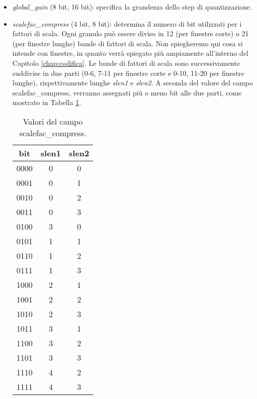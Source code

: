 \begin{itemize}
\begin{itemize}
						\item \textit{global\_gain} (8 bit, 16 bit): specifica la grandezza dello step di quantizzazione.
						
						\item \textit{scalefac\_compress} (4 bit, 8 bit): determina il numero di bit utilizzati per i fattori di scala. Ogni granulo può essere diviso in 12 (per finestre corte) o 21 (per finestre lunghe) bande di fattori di scala. Non spiegheremo qui cosa si intende con finestre, in quanto verrà spiegato più ampiamente all'interno del Capitolo \ref{chap:codifica}. Le bande di fattori di scala sono successivamente suddivise in due parti (0-6, 7-11 per finestre corte e 0-10, 11-20 per finestre lunghe), rispettivamente lunghe \textit{slen1} e \textit{slen2}. A seconda del valore del campo scalefac\_compress, verranno assegnati più o meno bit alle due parti, come mostrato in Tabella \ref{tab:campo_scalefac_compress}.
						
							\begin{table}[h!]
								\centering
								\begin{tabular}{|c|c|c|}
									\multicolumn{1}{c}{\textbf{bit}} & \multicolumn{1}{c}{\textbf{slen1}} & \multicolumn{1}{c}{\textbf{slen2}}\\
									\hline
									0000 & 0 & 0\\
									\hline
									0001 & 0 & 1\\
									\hline
									0010 & 0 & 2\\
									\hline
									0011 & 0 & 3\\
									\hline
									0100 & 3 & 0\\
									\hline
									0101 & 1 & 1\\
									\hline
									0110 & 1 & 2\\
									\hline
									0111 & 1 & 3\\
									\hline
									1000 & 2 & 1\\
									\hline
									1001 & 2 & 2\\
									\hline
									1010 & 2 & 3\\
									\hline
									1011 & 3 & 1\\
									\hline
									1100 & 3 & 2\\
									\hline
									1101 & 3 & 3\\
									\hline
									1110 & 4 & 2\\
									\hline
									1111 & 4 & 3\\
									\hline
								\end{tabular}
								\caption{Valori del campo scalefac\_compress.}
								\label{tab:campo_scalefac_compress}
							\end{table}
						

\end{itemize}
\end{itemize}
